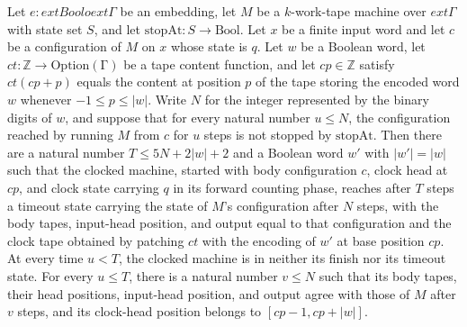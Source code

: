 \begin{theorem}
\label{Turing.sc_timeout}
\leanok
{}
Let $e:	ext{Bool}	o	ext{Γ}$ be an embedding, let $M$ be a $k$-work-tape machine over
$	ext{Γ}$ with state set $S$, and let $\mathrm{stopAt}:S\to\text{Bool}$. Let $x$ be a
finite input word and let $c$ be a configuration of $M$ on $x$ whose state is $q$. Let
$w$ be a Boolean word, let $ct:\mathbb Z\to\mathrm{Option}(\text{Γ})$ be a tape content
function, and let $cp\in\mathbb Z$ satisfy $ct(cp+p)$ equals the content at position $p$
of the tape storing the encoded word $w$ whenever $-1\le p\le |w|$. Write $N$ for the
integer represented by the binary digits of $w$, and suppose that for every natural
number $u\le N$, the configuration reached by running $M$ from $c$ for $u$ steps is not
stopped by $\mathrm{stopAt}$. Then there are a natural number $T\le 5N+2|w|+2$ and a
Boolean word $w'$ with $|w'|=|w|$ such that the clocked machine, started with body
configuration $c$, clock head at $cp$, and clock state carrying $q$ in its forward
counting phase, reaches after $T$ steps a timeout state carrying the state of $M$'s
configuration after $N$ steps, with the body tapes, input-head position, and output
equal to that configuration and the clock tape obtained by patching $ct$ with the
encoding of $w'$ at base position $cp$. At every time $u<T$, the clocked machine is in
neither its finish nor its timeout state. For every $u\le T$, there is a natural number
$v\le N$ such that its body tapes, their head positions, input-head position, and output
agree with those of $M$ after $v$ steps, and its clock-head position belongs to
$[cp-1,cp+|w|]$.
\end{theorem}

